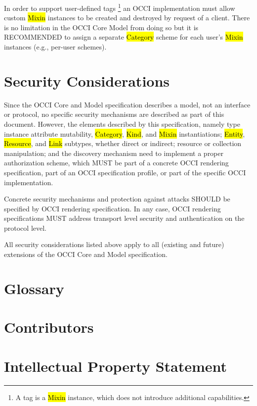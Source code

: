 \documentclass[10pt,a4paper]{article}
\begin{document}
In order to support user-defined tags%
\footnote{A tag is a \hl{Mixin} instance, which does not introduce
  additional capabilities.}
an OCCI implementation must allow custom \hl{Mixin}
instances to be created and destroyed by request of a client.  There
is no limitation in the OCCI Core Model from doing so but it is
RECOMMENDED to assign a separate \hl{Category} scheme for each user's
\hl{Mixin} instances (e.g., per-user schemes).

\section{Security Considerations}
Since the OCCI Core and Model specification describes a model, not an interface
or protocol, no specific security mechanisms are described as part of this
document. However, the elements described by this specification, namely type
instance attribute mutability, \hl{Category}, \hl{Kind}, and \hl{Mixin} instantiations; \hl{Entity},
\hl{Resource}, and \hl{Link} subtypes,  whether direct or indirect; resource or
collection manipulation; and the discovery mechanism need to implement a proper
authorization scheme, which MUST be part of a concrete OCCI rendering
specification, part of an OCCI specification profile, or part of the specific
OCCI implementation.

Concrete security mechanisms and protection against attacks SHOULD be specified
by OCCI rendering specification. In any case, OCCI rendering specifications MUST
address transport level security and authentication on the protocol level.

All security considerations listed above apply to all (existing and future)
extensions of the OCCI Core and Model specification.

\section{Glossary}
\label{sec:glossary}


\section{Contributors}


\section{Intellectual Property Statement}

\end{document}
